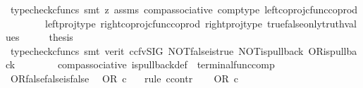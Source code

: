\begin{isabellebody}
\ {\isacharparenleft}{\kern0pt}typecheck{\isacharunderscore}{\kern0pt}cfuncs{\isacharcomma}{\kern0pt}\ smt\ {\isacharparenleft}{\kern0pt}z{}{\isacharparenright}{\kern0pt}\ assms\ comp{\isacharunderscore}{\kern0pt}associative{}\ comp{\isacharunderscore}{\kern0pt}type\ left{\isacharunderscore}{\kern0pt}coproj{\isacharunderscore}{\kern0pt}cfunc{\isacharunderscore}{\kern0pt}coprod\isanewline
\ \ \ \ \ \ \ \ left{\isacharunderscore}{\kern0pt}proj{\isacharunderscore}{\kern0pt}type\ right{\isacharunderscore}{\kern0pt}coproj{\isacharunderscore}{\kern0pt}cfunc{\isacharunderscore}{\kern0pt}coprod\ right{\isacharunderscore}{\kern0pt}proj{\isacharunderscore}{\kern0pt}type\ true{\isacharunderscore}{\kern0pt}false{\isacharunderscore}{\kern0pt}only{\isacharunderscore}{\kern0pt}truth{\isacharunderscore}{\kern0pt}values{\isacharparenright}{\kern0pt}\isanewline
\ \ \isamarkupfalse%
\ \isamarkupfalse%
\ {\isacharquery}{\kern0pt}thesis\ \isanewline
\ \ \ \ \isamarkupfalse%
\ {\isacharparenleft}{\kern0pt}typecheck{\isacharunderscore}{\kern0pt}cfuncs{\isacharcomma}{\kern0pt}\ smt\ {\isacharparenleft}{\kern0pt}verit{\isacharcomma}{\kern0pt}\ ccfv{\isacharunderscore}{\kern0pt}SIG{\isacharparenright}{\kern0pt}\ NOT{\isacharunderscore}{\kern0pt}false{\isacharunderscore}{\kern0pt}is{\isacharunderscore}{\kern0pt}true\ NOT{\isacharunderscore}{\kern0pt}is{\isacharunderscore}{\kern0pt}pullback\ OR{\isacharunderscore}{\kern0pt}is{\isacharunderscore}{\kern0pt}pullback\isanewline
\ \ \ \ \ \ \ \ comp{\isacharunderscore}{\kern0pt}associative{}\ is{\isacharunderscore}{\kern0pt}pullback{\isacharunderscore}{\kern0pt}def\ \ terminal{\isacharunderscore}{\kern0pt}func{\isacharunderscore}{\kern0pt}comp{\isacharparenright}{\kern0pt}\isanewline
{}\isamarkupfalse%
%
\endisatagproof
{\isafoldproof}%
%
\isadelimproof
\isanewline
%
\endisadelimproof
\isanewline
{}\isamarkupfalse%
\ OR{\isacharunderscore}{\kern0pt}false{\isacharunderscore}{\kern0pt}false{\isacharunderscore}{\kern0pt}is{\isacharunderscore}{\kern0pt}false{\isacharcolon}{\kern0pt}\isanewline
\ \ {\isachardoublequoteopen}OR\ {\isasymcirc}\isactrlsub c\ {\isasymlangle}{\isasymf}{\isacharcomma}{\kern0pt}{\isasymf}{\isasymrangle}\ {\isacharequal}{\kern0pt}\ {\isasymf}{\isachardoublequoteclose}\isanewline
%
\isadelimproof
%
\endisadelimproof
%
\isatagproof
{}\isamarkupfalse%
{\isacharparenleft}{\kern0pt}rule\ ccontr{\isacharparenright}{\kern0pt}\isanewline
\ \ \isamarkupfalse%
\ {\isachardoublequoteopen}OR\ {\isasymcirc}\isactrlsub c\ {\isasymlangle}{\isasymf}{\isacharcomma}{\kern0pt}{\isasymf}{\isasymrangle}\ {\isasymnoteq}\ {\isasymf}{\isachardoublequoteclose}\isanewline

\end{isabellebody}
